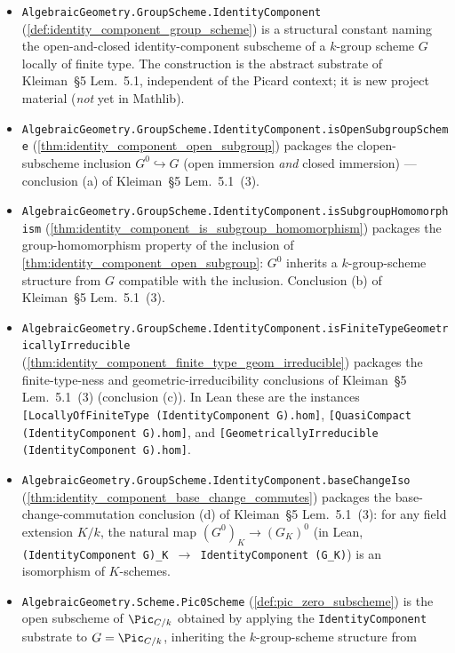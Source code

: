 \begin{itemize}
  \item \texttt{AlgebraicGeometry.GroupScheme.IdentityComponent}
    (\cref{def:identity_component_group_scheme}) is a structural
    constant naming the open-and-closed identity-component subscheme
    of a \(k\)-group scheme \(G\) locally of finite type. The construction
    is the abstract substrate of Kleiman~\S 5 Lem.~5.1,
    independent of the Picard context; it is new project material
    (\emph{not} yet in Mathlib).
  \item \texttt{AlgebraicGeometry.GroupScheme.IdentityComponent.isOpenSubgroupScheme}
    (\cref{thm:identity_component_open_subgroup}) packages the
    clopen-subscheme inclusion \(G^0 \hookrightarrow G\) (open immersion
    \emph{and} closed immersion) --- conclusion (a) of Kleiman~\S 5
    Lem.~5.1~(3).
  \item \texttt{AlgebraicGeometry.GroupScheme.IdentityComponent.isSubgroupHomomorphism}
    (\cref{thm:identity_component_is_subgroup_homomorphism}) packages
    the group-homomorphism property of the inclusion of
    \cref{thm:identity_component_open_subgroup}: \(G^0\) inherits a
    \(k\)-group-scheme structure from \(G\) compatible with the
    inclusion. Conclusion (b) of Kleiman~\S 5 Lem.~5.1~(3).
  \item \texttt{AlgebraicGeometry.GroupScheme.IdentityComponent.isFiniteTypeGeometricallyIrreducible}
    (\cref{thm:identity_component_finite_type_geom_irreducible})
    packages the finite-type-ness and geometric-irreducibility
    conclusions of Kleiman~\S 5 Lem.~5.1~(3) (conclusion (c)).
    In Lean these are the instances
    \texttt{[LocallyOfFiniteType (IdentityComponent G).hom]},
    \texttt{[QuasiCompact (IdentityComponent G).hom]}, and
    \texttt{[GeometricallyIrreducible (IdentityComponent G).hom]}.
  \item \texttt{AlgebraicGeometry.GroupScheme.IdentityComponent.baseChangeIso}
    (\cref{thm:identity_component_base_change_commutes}) packages the
    base-change-commutation conclusion (d) of Kleiman~\S 5
    Lem.~5.1~(3): for any field extension \(K/k\), the natural
    map \((G^0)_K \to (G_K)^0\) (in Lean,
    \texttt{(IdentityComponent G)\_K \(\to\) IdentityComponent (G\_K)})
    is an isomorphism of \(K\)-schemes.
  \item \texttt{AlgebraicGeometry.Scheme.Pic0Scheme}
    (\cref{def:pic_zero_subscheme}) is the open subscheme of
    \(\Pic_{C/k}\) obtained by applying the
    \texttt{IdentityComponent} substrate to
    \(G = \Pic_{C/k}\), inheriting the \(k\)-group-scheme structure from

\end{itemize}
